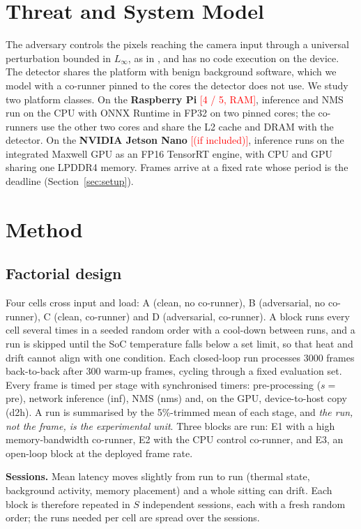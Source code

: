 \documentclass[conference]{IEEEtran}
\newcommand{\TODO}[1]{\textcolor{red}{[#1]}}
\begin{document}
\section{Threat and System Model}
The adversary controls the pixels reaching the camera input through a universal perturbation
bounded in $L_\infty$, as in \cite{shapira2023phantom}, and has no code execution on the device.
The detector shares the platform with benign background software, which we model with a
co-runner pinned to the cores the detector does not use. We study two platform classes.
On the \textbf{Raspberry Pi} \TODO{4 / 5, RAM}, inference and NMS run on the CPU with ONNX Runtime
in FP32 on two pinned cores; the co-runners use the other two cores and share the L2 cache and
DRAM with the detector. On the \textbf{NVIDIA Jetson Nano} \TODO{(if included)}, inference runs on
the integrated Maxwell GPU as an FP16 TensorRT engine, with CPU and GPU sharing one LPDDR4 memory.
Frames arrive at a fixed rate whose period is the deadline (Section~\ref{sec:setup}).

\section{Method}
\subsection{Factorial design}
Four cells cross input and load: A (clean, no co-runner), B (adversarial, no co-runner),
C (clean, co-runner) and D (adversarial, co-runner). A block runs every cell several times in a
seeded random order with a cool-down between runs, and a run is skipped until the SoC temperature
falls below a set limit, so that heat and drift cannot align with one condition. Each closed-loop
run processes 3000 frames back-to-back after 300 warm-up frames, cycling through a fixed evaluation
set. Every frame is timed per stage with synchronised timers: pre-processing ($s{=}$pre), network
inference (inf), NMS (nms) and, on the GPU, device-to-host copy (d2h). A run is summarised by the
5\%-trimmed mean of each stage, and \emph{the run, not the frame, is the experimental unit}.
Three blocks are run: E1 with a high memory-bandwidth co-runner, E2 with the CPU control
co-runner, and E3, an open-loop block at the deployed frame rate.

\textbf{Sessions.} Mean latency moves slightly from run to run (thermal state, background
activity, memory placement) and a whole sitting can drift. Each block is therefore repeated in
$S$ independent sessions, each with a fresh random order; the runs needed per cell are spread
over the sessions.
\end{document}
